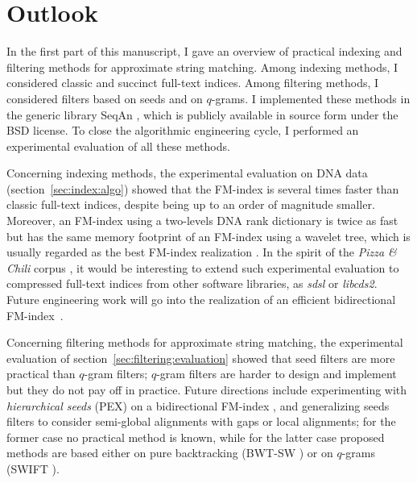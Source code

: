 \chapter{Outlook}

In the first part of this manuscript, I gave an overview of practical indexing and filtering methods for approximate string matching.
Among indexing methods, I considered classic and succinct full-text indices.
Among filtering methods, I considered filters based on seeds and on $q$-grams.
I implemented these methods in the generic \CC library SeqAn \citep{Doering2008}, which is publicly available in source form under the BSD license.
To close the algorithmic engineering cycle, I performed an experimental evaluation of all these methods.

Concerning indexing methods, the experimental evaluation on DNA data (section~\ref{sec:index:algo}) showed that the FM-index is several times faster than classic full-text indices, despite being up to an order of magnitude smaller.
Moreover, an FM-index using a two-levels DNA rank dictionary is twice as fast but has the same memory footprint of an FM-index using a wavelet tree, which is usually regarded as the best FM-index realization \citep{Navarro2007}.
In the spirit of the \emph{Pizza \& Chili} corpus \citep{Ferragina2007a}, it would be interesting to extend such experimental evaluation to compressed full-text indices from other software libraries, as \emph{sdsl} \citep{Gog2014} or \emph{libcds2}.
Future engineering work will go into the realization of an efficient bidirectional FM-index~\citep{Lam2009, Schnattinger2010}.

Concerning filtering methods for approximate string matching, the experimental evaluation of section~\ref{sec:filtering:evaluation} showed that seed filters are more practical than $q$-gram filters; $q$-gram filters are harder to design and implement but they do not pay off in practice.
Future directions include experimenting with \emph{hierarchical seeds} (PEX) \citep{Navarro2001b} on a bidirectional FM-index \citep{Russo2009}, and generalizing seeds filters to consider semi-global alignments with gaps or local alignments; for the former case no practical method is known, while for the latter case proposed methods are based either on pure backtracking (BWT-SW \citep{Lam2008}) or on $q$-grams (SWIFT \citep{Rasmussen2006}).

